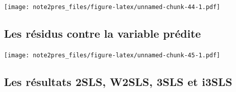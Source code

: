 \documentclass[11pt,]{article}
\begin{document}
\texttt{[image: note2pres\_files/figure-latex/unnamed-chunk-44-1.pdf]}

\FloatBarrier

\hypertarget{les-residus-contre-la-variable-predite}{%
\subsection{Les résidus contre la variable
prédite}\label{les-residus-contre-la-variable-predite}}

\FloatBarrier

\texttt{[image: note2pres\_files/figure-latex/unnamed-chunk-45-1.pdf]}

\FloatBarrier

\hypertarget{les-resultats-2sls-w2sls-3sls-et-i3sls}{%
\subsection{Les résultats 2SLS, W2SLS, 3SLS et
i3SLS}\label{les-resultats-2sls-w2sls-3sls-et-i3sls}}

\FloatBarrier
\end{document}
